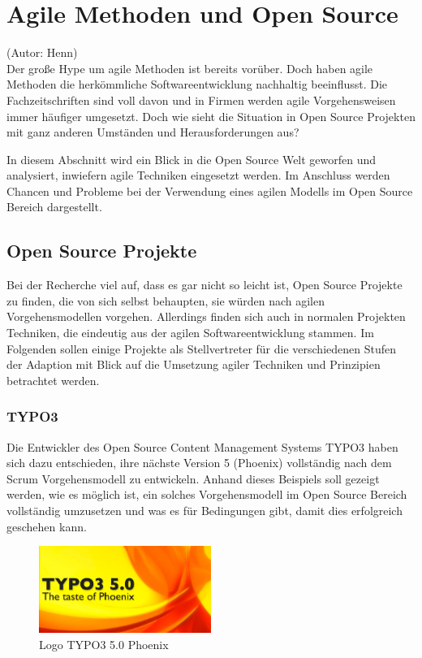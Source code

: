 \section{Agile Methoden und Open Source}
(Autor: Henn)\\

Der große Hype um agile Methoden ist bereits vorüber. Doch haben agile Methoden die herkömmliche Softwareentwicklung nachhaltig beeinflusst. Die Fachzeitschriften sind voll davon und in Firmen werden agile Vorgehensweisen immer häufiger umgesetzt. Doch wie sieht die Situation in Open Source Projekten mit ganz anderen Umständen und Herausforderungen aus?

In diesem Abschnitt wird ein Blick in die Open Source Welt geworfen und
analysiert, inwiefern agile Techniken eingesetzt werden. Im Anschluss werden
Chancen und Probleme bei der Verwendung eines agilen Modells im Open Source
Bereich dargestellt.


\subsection{Open Source Projekte}
Bei der Recherche viel auf, dass es gar nicht so leicht ist, Open Source
Projekte zu finden, die von sich selbst behaupten, sie würden nach agilen
Vorgehensmodellen vorgehen. Allerdings finden sich auch in normalen Projekten
Techniken, die eindeutig aus der agilen Softwareentwicklung stammen. Im Folgenden
sollen einige Projekte als Stellvertreter für die verschiedenen Stufen der
Adaption mit Blick auf die Umsetzung agiler Techniken und Prinzipien betrachtet werden.

\subsubsection{TYPO3}
Die Entwickler des Open Source Content Management Systems TYPO3 haben sich dazu
entschieden, ihre nächste Version 5 (Phoenix) vollständig nach dem Scrum Vorgehensmodell zu
entwickeln. Anhand dieses Beispiels soll gezeigt werden, wie es möglich ist,
ein solches Vorgehensmodell im Open Source Bereich vollständig umzusetzen und
was es für Bedingungen gibt, damit dies erfolgreich geschehen kann.
\begin{figure}[h]
	\centering
	\includegraphics[width=0.5\textwidth]{images/typo3_Phoenix_logo.jpg}
	\caption{Logo TYPO3 5.0 Phoenix}
	\label{Logo-Phoenix}
\end{figure}

